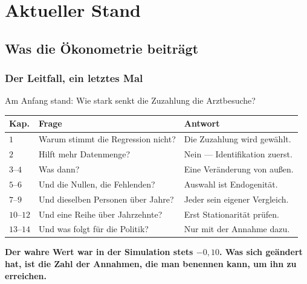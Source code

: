 \part{Aktueller Stand}

\chapter{Was die Ökonometrie beiträgt}

\section{Der Leitfall, ein letztes Mal}

\begin{merksatz}
Am Anfang stand: Wie stark senkt die Zuzahlung die Arztbesuche?

\begin{center}
{\small
\renewcommand{\arraystretch}{1.5}
\begin{tabular}{@{}P{1.2cm}P{3.4cm}P{3.6cm}@{}}
\toprule
\textbf{Kap.} & \textbf{Frage} & \textbf{Antwort}\\
\midrule
$1$ & Warum stimmt die Regression nicht? & Die Zuzahlung wird gewählt.\\
$2$ & Hilft mehr Datenmenge? & Nein --- Identifikation zuerst.\\
$3$--$4$ & Was dann? & Eine Veränderung von außen.\\
$5$--$6$ & Und die Nullen, die Fehlenden? & Auswahl ist Endogenität.\\
$7$--$9$ & Und dieselben Personen über Jahre? & Jeder sein eigener Vergleich.\\
$10$--$12$ & Und eine Reihe über Jahrzehnte? & Erst Stationarität prüfen.\\
$13$--$14$ & Und was folgt für die Politik? & Nur mit der Annahme dazu.\\
\bottomrule
\end{tabular}}
\end{center}

\begin{center}
\begin{minipage}{0.9\textwidth}
\textbf{Der wahre Wert war in der Simulation stets $-0{,}10$. Was sich geändert hat, ist die Zahl der Annahmen, die man benennen kann, um ihn zu erreichen.}
\end{minipage}
\end{center}
\end{merksatz}

